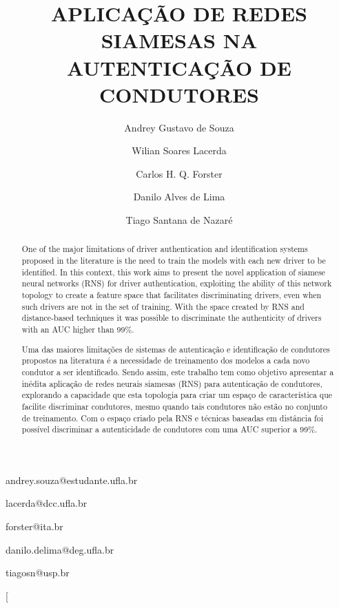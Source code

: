\documentclass[conference,harvard,brazil,english]{sbatex}
\begin{document}

\title{APLICAÇÃO DE REDES SIAMESAS NA AUTENTICAÇÃO DE CONDUTORES}

\author{Andrey Gustavo de Souza}{andrey.souza@estudante.ufla.br}
\address{Departamento de Automática\\ Universidade Federal de Lavras\\ Lavras, Minas Gerais, Brasil}

\author[1]{Wilian Soares Lacerda}{lacerda@dcc.ufla.br}

\author{Carlos H. Q. Forster}{forster@ita.br}
\address{Instituto Tecnológico de Aeronáutica \\ São José dos Campos, SP, Brasil}

\author[1]{Danilo Alves de Lima}{danilo.delima@deg.ufla.br}

\author{Tiago Santana de Nazaré}{tiagosn@usp.br}
\address{Time de \textit{Data Science}, Itaú-Unibanco \\
São Paulo, SP, Brasil}



\twocolumn[

\maketitle

\begin{abstract}
One of the major limitations of driver authentication and identification systems proposed in the literature is the need to train the models with each new driver to be identified. In this context, this work aims to present the novel application of siamese neural networks (RNS) for driver authentication, exploiting the ability of this network topology to create a feature space that facilitates discriminating drivers, even when such drivers are not in the set of training. With the space created by RNS and distance-based techniques it was possible to discriminate the authenticity of drivers with an AUC higher than 99\%.   \end{abstract}


\begin{abstract}
 Uma das maiores limitações de  sistemas de autenticação e identificação de condutores propostos na literatura é a necessidade de treinamento dos modelos a cada novo condutor a ser identificado. Sendo assim, este trabalho tem como objetivo apresentar a inédita aplicação de redes neurais siamesas (RNS) para autenticação de condutores, explorando a capacidade que esta topologia para criar um espaço de característica que facilite discriminar condutores, mesmo quando tais condutores não estão no conjunto de treinamento. Com o espaço criado pela RNS e técnicas baseadas em distância foi possível discriminar a autenticidade de condutores com uma AUC superior a 99\%.
\end{abstract}
\end{document}
